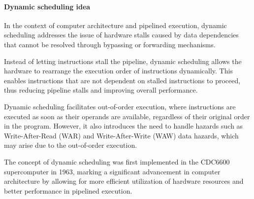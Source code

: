 \paragraph*{Dynamic scheduling idea}
In the context of computer architecture and pipelined execution, dynamic scheduling addresses the issue of hardware stalls caused by data dependencies that cannot be resolved through bypassing or forwarding mechanisms.

Instead of letting instructions stall the pipeline, dynamic scheduling allows the hardware to rearrange the execution order of instructions dynamically. 
This enables instructions that are not dependent on stalled instructions to proceed, thus reducing pipeline stalls and improving overall performance.

Dynamic scheduling facilitates out-of-order execution, where instructions are executed as soon as their operands are available, regardless of their original order in the program. However, it also introduces the need to handle hazards such as Write-After-Read (WAR) and Write-After-Write (WAW) data hazards, which may arise due to the out-of-order execution.

The concept of dynamic scheduling was first implemented in the CDC6600 supercomputer in 1963, marking a significant advancement in computer architecture by allowing for more efficient utilization of hardware resources and better performance in pipelined execution.

